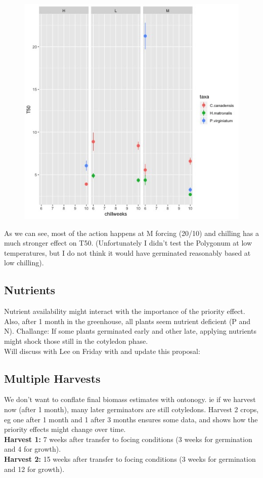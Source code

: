 \documentclass{article}\usepackage[]{graphicx}\usepackage[]{color}
\begin{document}
 \begin{figure}[h!]
        \centering
          \includegraphics[width=\textwidth]{prelimT50.jpeg}

    \end{figure}    

As we can see, most of the action happens at M forcing (20/10) and chilling has a much stronger effect on T50. (Unfortunately I didn't test the Polygonum at low temperatures, but I do not think it would have germinated reasonably based at low chilling).

\subsection{Nutrients}
Nutrient availability might interact with the importance of the priority effect. Also, after 1 month in the greenhouse, all plants seem nutrient deficient (P and N). Challange: If some plants germinated early and other late, applying nutrients might shock those still in the cotyledon phase.\\
Will discuss with Lee on Friday with and update this proposal:\\

\subsection{Multiple Harvests}
We don't want to conflate final biomass estimates with ontonogy. ie if we harvest now (after 1 month), many later germinators are still cotyledons. Harvest 2 crops, eg one after 1 month and 1 after 3 months ensures some data, and shows how the priority effects might change over time.\\
\textbf{Harvest 1:} 7 weeks after transfer to focing conditions (3 weeks for germination and 4 for growth).\\
\textbf{Harvest 2:} 15 weeks after transfer to focing conditions (3 weeks for germination and 12 for growth).\\
\end{document}
